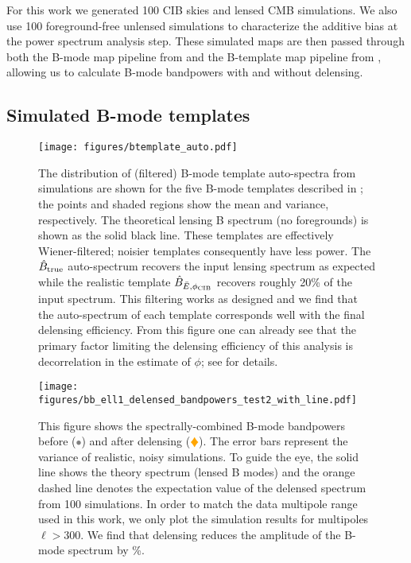For this work we generated 100 CIB skies and lensed CMB simulations.
We also use 100 foreground-free unlensed simulations to characterize the additive bias at the power spectrum analysis step.
These simulated maps are then passed through both the B-mode map pipeline from  and the B-template map pipeline from ,
allowing us to calculate B-mode bandpowers with and without delensing.

\subsection{Simulated B-mode templates}
\label{sec:sim_template}


\begin{figure}
\begin{center}
\texttt{[image: figures/btemplate\_auto.pdf]}
\caption{The distribution of (filtered) B-mode template auto-spectra from simulations are shown for the five B-mode templates described in ;
 the points and shaded regions show the mean and variance, respectively.
 The theoretical lensing B spectrum (no foregrounds) is shown as the solid black line.
 These templates are effectively Wiener-filtered; noisier templates consequently have less power.
 The $\hat{B}_{\rm true}$ auto-spectrum recovers the input lensing spectrum as expected while the realistic template $\hat{B}_{\bar{E} ,\phi_{\rm CIB}}$ recovers roughly 20\% of the input spectrum.
 This filtering works as designed and we find that the auto-spectrum of each template corresponds well with the final delensing efficiency.
 From this figure one can already see that the primary factor limiting the delensing efficiency of this analysis is decorrelation in the estimate of $\phi$; see  for details.
}
\label{fig:bhat_auto}
\end{center}
\end{figure}

\begin{figure*}
\begin{center}
\texttt{[image: figures/bb\_ell1\_delensed\_bandpowers\_test2\_with\_line.pdf]}
\caption{
This figure shows the spectrally-combined B-mode bandpowers before (\textcolor{gray}{$\bullet$}) and after delensing (\textcolor{orange}{$\vardiamond$}).
The error bars represent the variance of realistic, noisy simulations.
To guide the eye, the solid line shows the theory spectrum (lensed B modes) and the orange dashed line denotes the expectation value of the delensed spectrum from 100 simulations.
In order to match the data multipole range used in this work, we only plot the simulation results for multipoles $\ell > 300$.
We find that delensing reduces the amplitude of the B-mode spectrum by \effData\%.
}
\label{fig:bandpowers}
\end{center}
\end{figure*}

